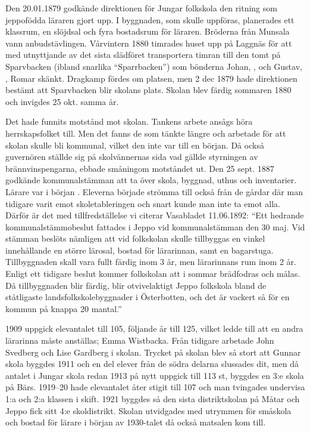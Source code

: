 %
Den 20.01.1879 godkände direktionen för Jungar folkskola den ritning som jeppofödda läraren  gjort upp. I byggnaden, som skulle uppföras, planerades ett klassrum, en slöjdsal och fyra bostadsrum för läraren. Bröderna  från Munsala vann anbudstävlingen. Vårvintern 1880 timrades huset upp på Laggnäs för att med utnyttjande av det sista slädföret transportera timran till den tomt på Sparvbacken (ibland snarlika ``Sparrbacken'') som bönderna Johan, , och Gustav, , Romar skänkt. Dragkamp fördes om platsen, men 2 dec 1879 hade direktionen bestämt att Sparvbacken blir skolans plats. Skolan blev färdig sommaren 1880 och invigdes 25 okt. samma år.

Det hade funnits motstånd mot skolan. Tankens arbete ansågs höra herrskapsfolket till. Men det fanns de som tänkte längre och arbetade för att skolan skulle bli kommunal, vilket den inte var till en början. Då också guvernören ställde sig på skolvännernas sida vad gällde styrningen av brännvinspengarna, ebbade småningom motståndet ut. Den 25 sept. 1887 godkände kommunalstämman att ta över skola, byggnad, uthus och inventarier. Lärare var i början . Eleverna började strömma till också från de gårdar där man tidigare varit emot skoletableringen och snart kunde man inte ta emot alla. Därför är det  med tillfredställelse vi citerar Vasabladet 11.06.1892: ``Ett hedrande kommunalstämmobeslut fattades i Jeppo vid kommunalstämman den 30 maj. Vid stämman beslöts nämligen att vid folkskolan skulle tillbyggas en vinkel innehållande en större lärosal, bostad för lärarinnan, samt en bagarstuga. Tillbyggnaden skall vara fullt färdig inom 3 år, men lärarinnans rum inom 2 år. Enligt ett tidigare beslut kommer folkskolan att i sommar brädfodras och målas. Då tillbyggnaden blir färdig, blir otvivelaktigt Jeppo folkskola bland de ståtligaste landsfolkskolebyggnader i Österbotten, och det är vackert så för en kommun på knappa 20 mantal.''

1909 uppgick elevantalet till 105, följande år till 125, vilket ledde till att en andra lärarinna måste anställas; Emma Wistbacka. Från tidigare arbetade John Svedberg och Lise Gardberg i skolan. Trycket på skolan blev så stort att Gunnar skola byggdes 1911 och en del elever från de södra delarna slussades dit, men då antalet i Jungar skola redan 1913 på nytt uppgick till 113 st, byggdes en 3:e skola på Bärs. 1919--20 hade elevantalet åter stigit till 107 och man tvingades undervisa 1:a och 2:a klassen i skift. 1921 byggdes så den sista distriktskolan på Måtar och Jeppo fick sitt 4:e skoldistrikt. Skolan utvidgades med utrymmen för småskola och bostad för lärare i början av 1930-talet då också matsalen kom till.

